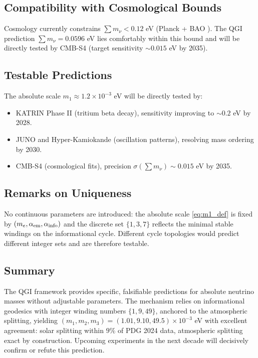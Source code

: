 \documentclass{article}
\numberwithin{equation}{section}
\theoremstyle{plain}
\theoremstyle{definition}
\theoremstyle{remark}
\begin{document}
\subsection{Compatibility with Cosmological Bounds}
Cosmology currently constrains $\sum m_\nu < 0.12$ eV (Planck + BAO \cite{Planck2018}). 
The QGI prediction $\sum m_\nu = 0.0596$ eV lies comfortably within this bound and will be directly tested by CMB-S4 (target sensitivity $\sim 0.015$ eV by 2035).

\subsection{Testable Predictions}
The absolute scale $m_1 \approx 1.2\times 10^{-3}$ eV will be directly tested by:
\begin{itemize}
    \item KATRIN Phase II (tritium beta decay), sensitivity improving to $\sim 0.2$ eV by 2028.
    \item JUNO and Hyper-Kamiokande (oscillation patterns), resolving mass ordering by 2030.
    \item CMB-S4 (cosmological fits), precision $\sigma(\sum m_\nu) \sim 0.015$ eV by 2035.
\end{itemize}

\subsection{Remarks on Uniqueness}
No continuous parameters are introduced: the absolute scale \eqref{eq:m1_def} is fixed by $(m_e,\alpha_{\rm em},\alpha_{\rm info})$ and the discrete set $\{1,3,7\}$ reflects the minimal stable windings on the informational cycle. Different cycle topologies would predict different integer sets and are therefore testable.

\subsection{Summary}
The QGI framework provides specific, falsifiable predictions for absolute neutrino masses without adjustable parameters. The mechanism relies on informational geodesics with integer winding numbers $\{1,9,49\}$, anchored to the atmospheric splitting, yielding $(m_1, m_2, m_3) = (1.01, 9.10, 49.5)\times 10^{-3}$ eV with excellent agreement: solar splitting within $9\%$ of PDG 2024 data, atmospheric splitting exact by construction. Upcoming experiments in the next decade will decisively confirm or refute this prediction.
\end{document}

